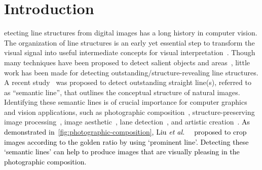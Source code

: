 \documentclass[10pt,journal,cspaper,compsoc]{IEEEtran}
\newcommand{\revise}[1]{{\textcolor{black}{#1}}}
\def\etal{\emph{et al.~}}
\def\eg{\emph{e.g.,~}}
\begin{document}
\IEEEdisplaynontitleabstractindextext

\IEEEpeerreviewmaketitle

\section{Introduction}\label{sec:introduction}

etecting line structures from digital images has 
a long history in computer vision.
%
The organization of line structures is an early yet essential step to transform the visual signal into useful intermediate concepts 
for visual interpretation~\cite{burns1986extracting}.
%
Though many techniques have been proposed to detect salient objects
\cite{zhao2019optimizing,HouPami19Dss,gao2020sod100k,BorjiCVM2019,wang2021revisiting}
and areas~\cite{cheng2015global,zhu2014saliency,Fan2020S4Net},
little work has been made for detecting outstanding/structure-revealing line structures.
%
A recent study~\cite{lee2017semantic} was proposed to detect outstanding straight line(s),
referred to as ``semantic line'', that outlines the conceptual structure of natural images.
%
Identifying these semantic lines is of crucial importance for 
computer graphics and vision applications, such as 
photographic composition~\cite{liu2010optimizing,freeman2007photographer},
structure-preserving image processing~\cite{TIP20_SP_NPR,hu2013patchnet},
image aesthetic~\cite{ko2018pac,lee2019property,kong2016photo,mai2016composition},
lane detection~\cite{fan2019spinnet},
and artistic creation~\cite{krages2012photography,hu2013inverse,chen2009sketch2photo,zhang2020and}.
%
\revise{
  As demonstrated in~\cref{fig:photographic-composition}, 
Liu \etal~\cite{liu2010optimizing} proposed to crop images according 
to the golden ratio by using `prominent line'.
Detecting these `semantic lines' can help to produce images that
are visually pleasing in the photographic composition.
}
\end{document}
